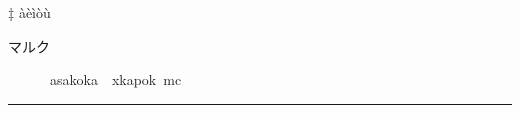 \documentclass{article}
\begin{document}
 
‡ àèìòù

マルク


\vfill      asakoka  xkapok mc
\hrule    
\vspace{1.2mm}
\begin{tiny}
\end{tiny}
\end{document}
